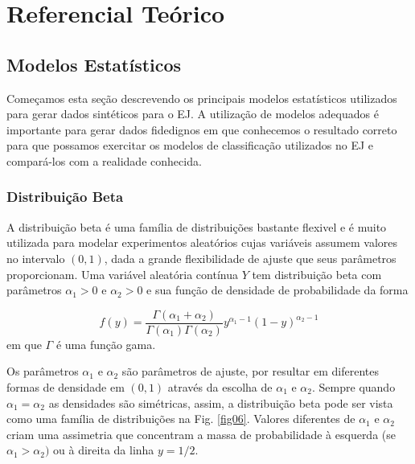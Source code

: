 \chapter{Referencial Teórico}
\label{chap:3}

\section{Modelos Estatísticos}

Começamos esta seção descrevendo os principais modelos estatísticos utilizados para gerar dados sintéticos para o EJ. A utilização de modelos adequados é importante para gerar dados fidedignos em que conhecemos o resultado correto para que possamos exercitar os modelos de classificação utilizados no EJ e compará-los com a realidade conhecida.

\subsection{Distribuição Beta}

A distribuição beta é uma família de distribuições bastante flexivel e é muito utilizada para modelar experimentos aleatórios cujas variáveis assumem valores no intervalo $(0,1)$, dada a grande flexibilidade de ajuste que seus parâmetros proporcionam. Uma variável aleatória contínua $Y$ tem distribuição beta com parâmetros $\alpha_1 > 0$ e $\alpha_2 > 0$ e sua função de densidade de probabilidade da forma

\begin{equation}
f(y)=\frac {\Gamma(\alpha_1+\alpha_2)}{\Gamma(\alpha_1)\Gamma(\alpha_2)} y^{\alpha_1-1}(1-y)^{\alpha_2-1}
\end{equation}
%
em que $\Gamma$ é uma função gama.

Os parâmetros $\alpha_1$ e $\alpha_2$ são parâmetros de ajuste, por resultar em diferentes formas de densidade em $(0,1)$ através da escolha de $\alpha_1$ e $\alpha_2$. Sempre quando $\alpha_1 = \alpha_2$ as densidades são simétricas, assim, a distribuição beta pode ser vista como uma família de distribuições na Fig. \ref{fig06}. Valores diferentes de $\alpha_1$ e $\alpha_2$ criam uma assimetria que concentram a massa de probabilidade à esquerda (se $\alpha_1 > \alpha_2)$ ou à direita da linha $y=1/2$.


